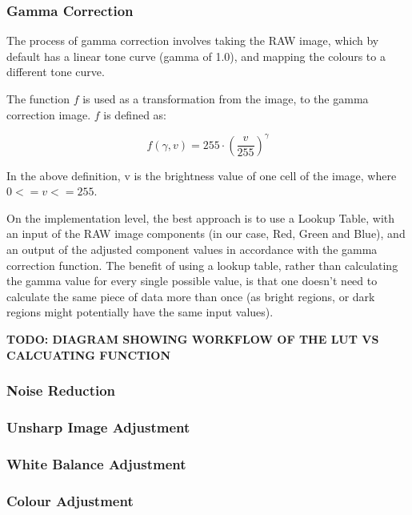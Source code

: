 \documentclass[12pt,a4paper]{article}
\begin{document}
\subsubsection{Gamma Correction}
The process of gamma correction involves taking the RAW image, which by default has a linear tone curve (gamma of 1.0), and
mapping the colours to a different tone curve.

The function $f$ is used as a transformation from the image, to the gamma correction image. $f$ is defined as:

$$f(\gamma, v) = 255 \cdot (\frac{v}{255})^{\gamma}$$

In the above definition, v is the brightness value of one cell of the image, where $0 <= v <= 255$.

On the implementation level, the best approach is to use a Lookup Table, with an input of the RAW image components (in our case, Red, Green and Blue),
and an output of the adjusted component values in accordance with the gamma correction function. The benefit of using a lookup table, rather than calculating
the gamma value for every single possible value, is that one doesn't need to calculate the same piece of data more than once (as bright regions, or dark regions might
potentially have the same input values). 

\textbf{TODO: DIAGRAM SHOWING WORKFLOW OF THE LUT VS CALCUATING FUNCTION}
\subsubsection{Noise Reduction}
\subsubsection{Unsharp Image Adjustment}

\subsubsection{White Balance Adjustment}

\subsubsection{Colour Adjustment}
\end{document}
